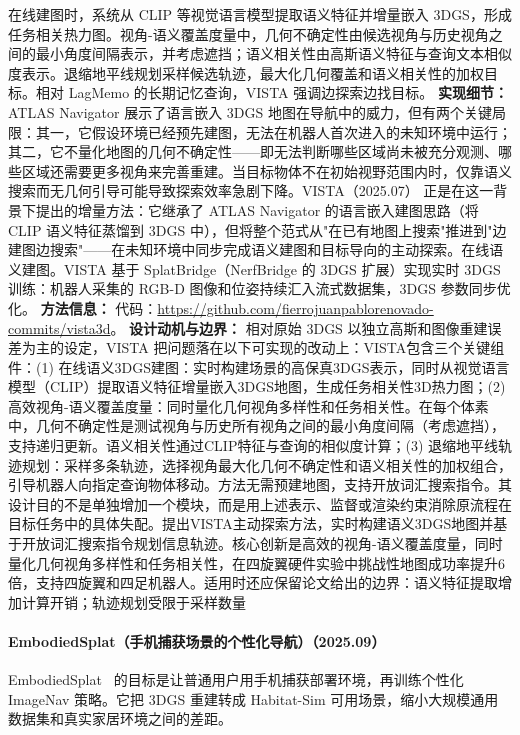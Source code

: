 在线建图时，系统从 CLIP 等视觉语言模型提取语义特征并增量嵌入 3DGS，形成任务相关热力图。视角-语义覆盖度量中，几何不确定性由候选视角与历史视角之间的最小角度间隔表示，并考虑遮挡；语义相关性由高斯语义特征与查询文本相似度表示。退缩地平线规划采样候选轨迹，最大化几何覆盖和语义相关性的加权目标。相对 LagMemo 的长期记忆查询，VISTA 强调边探索边找目标。
\textbf{实现细节：} ATLAS Navigator 展示了语言嵌入 3DGS 地图在导航中的威力，但有两个关键局限：其一，它假设环境已经预先建图，无法在机器人首次进入的未知环境中运行；其二，它不量化地图的几何不确定性——即无法判断哪些区域尚未被充分观测、哪些区域还需要更多视角来完善重建。当目标物体不在初始视野范围内时，仅靠语义搜索而无几何引导可能导致探索效率急剧下降。VISTA（2025.07） 正是在这一背景下提出的增量方法：它继承了 ATLAS Navigator 的语言嵌入建图思路（将 CLIP 语义特征蒸馏到 3DGS 中），但将整个范式从"在已有地图上搜索"推进到"边建图边搜索"——在未知环境中同步完成语义建图和目标导向的主动探索。在线语义建图。VISTA 基于 SplatBridge（NerfBridge 的 3DGS 扩展）实现实时 3DGS 训练：机器人采集的 RGB-D 图像和位姿持续汇入流式数据集，3DGS 参数同步优化。
\textbf{方法信息：} 代码：\url{https://github.com/fierrojuanpablorenovado-commits/vista3d}。
\textbf{设计动机与边界：} 相对原始 3DGS 以独立高斯和图像重建误差为主的设定，VISTA 把问题落在以下可实现的改动上：VISTA包含三个关键组件：(1) 在线语义3DGS建图：实时构建场景的高保真3DGS表示，同时从视觉语言模型（CLIP）提取语义特征增量嵌入3DGS地图，生成任务相关性3D热力图；(2) 高效视角-语义覆盖度量：同时量化几何视角多样性和任务相关性。在每个体素中，几何不确定性是测试视角与历史所有视角之间的最小角度间隔（考虑遮挡），支持递归更新。语义相关性通过CLIP特征与查询的相似度计算；(3) 退缩地平线轨迹规划：采样多条轨迹，选择视角最大化几何不确定性和语义相关性的加权组合，引导机器人向指定查询物体移动。方法无需预建地图，支持开放词汇搜索指令。其设计目的不是单独增加一个模块，而是用上述表示、监督或渲染约束消除原流程在目标任务中的具体失配。提出VISTA主动探索方法，实时构建语义3DGS地图并基于开放词汇搜索指令规划信息轨迹。核心创新是高效的视角-语义覆盖度量，同时量化几何视角多样性和任务相关性，在四旋翼硬件实验中挑战性地图成功率提升6倍，支持四旋翼和四足机器人。适用时还应保留论文给出的边界：语义特征提取增加计算开销；轨迹规划受限于采样数量
\paragraph{EmbodiedSplat（手机捕获场景的个性化导航）（2025.09）}
EmbodiedSplat~\cite{2509_17430} 的目标是让普通用户用手机捕获部署环境，再训练个性化 ImageNav 策略。它把 3DGS 重建转成 Habitat-Sim 可用场景，缩小大规模通用数据集和真实家居环境之间的差距。

